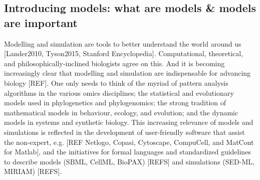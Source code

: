 \subsection{Introducing models: what are models \& models are important}

Modelling and simulation are tools to better understand the world around us [Lander2010, Tyson2015, Stanford Encyclopedia]. Computational, theoretical, and philosophically-inclined biologists agree on this. And it is becoming increasingly clear that modelling and simulation are indispensable for advancing biology [REF]. One only needs to think of the myriad of pattern analysis algorithms in the various omics disciplines; the statistical and evolutionary models used in phylogenetics and phylogenomics; the strong tradition of mathematical models in behaviour, ecology, and evolution; and the dynamic models in systems and synthetic biology. This increasing relevance of models and simulations is reflected in the development of user-friendly software that assist the non-expert, e.g. [REF Netlogo, Copasi, Cytoscape, CompuCell, and MatCont for Matlab], and the initiatives for formal languages and standardized guidelines to describe models (SBML, CellML, BioPAX) [REFS] and simulations (SED-ML, MIRIAM) [REFS].
